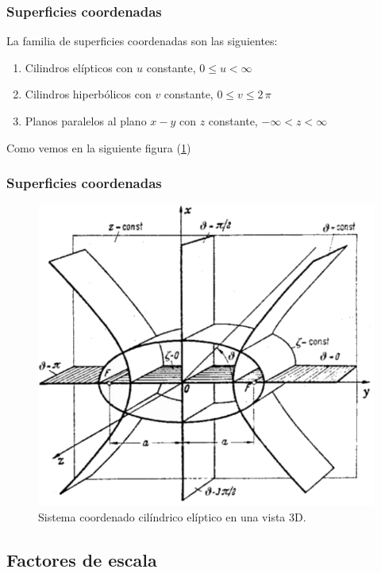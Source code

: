 \documentclass[12pt]{beamer}
\begin{document}
\begin{frame}
\frametitle{Superficies coordenadas}
La familia de superficies coordenadas son las siguientes:
\pause
{}
\begin{enumerate}[<+->]
\item Cilindros elípticos con $u$ constante, $0 \leq u < \infty$
\item Cilindros hiperbólicos con $v$ constante, $0 \leq v \leq 2 \, \pi$
\item Planos paralelos al plano $x-y$ con $z$ constante, $-\infty < z < \infty$
\end{enumerate}
\pause
Como vemos en la siguiente figura (\ref{fig:figura_coordenada_cilindricas_elipticas_3D})
\end{frame}
\begin{frame}
\frametitle{Superficies coordenadas}
\begin{figure}[H]
    \centering
    \includegraphics[scale=0.3]{Imagenes/Elliptic-cylindrical-coordinates_02.png}
    \caption{Sistema coordenado cilíndrico elíptico en una vista 3D.}
    \label{fig:figura_coordenada_cilindricas_elipticas_3D}
\end{figure}
\end{frame}

\subsection{Factores de escala}
\end{document}
